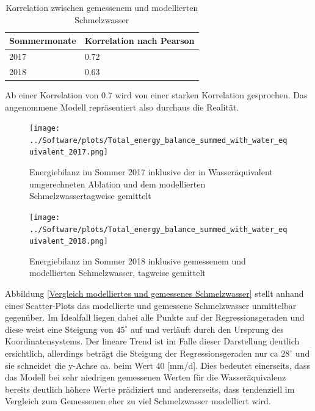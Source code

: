 \documentclass[12pt,a4paper]{article}
\begin{document}
\begin{table}[H]
\centering
{} 
\caption{Korrelation zwischen gemessenem und modellierten Schmelzwasser}
\label{tab:Korrelation zwischen gemessenem und modellierten Schmelzwasser}
\begin{tabular}{|l|l|}
\hline
Sommermonate & Korrelation nach Pearson \\ \hline
2017         & 0.72                     \\ \hline
2018         & 0.63                     \\ \hline
\end{tabular}
\end{table}

Ab einer Korrelation von 0.7 wird von einer starken Korrelation gesprochen. Das angenommene Modell repräsentiert also durchaus die Realität.

\begin{figure}[H]
\centering
\texttt{[image: ../Software/plots/Total\_energy\_balance\_summed\_with\_water\_equivalent\_2017.png]}
\caption{Energiebilanz im Sommer 2017 inklusive der in Wasseräquivalent umgerechneten Ablation und dem modellierten Schmelzwassertagweise gemittelt}
\label{fig:Energiebilanz im Sommer 2017 inklusive der in Wasseräquivalent umgerechneten Ablation und dem modellierten Schmelzwasser}
\end{figure}

\begin{figure}[H]
\centering
\texttt{[image: ../Software/plots/Total\_energy\_balance\_summed\_with\_water\_equivalent\_2018.png]}
\caption{Energiebilanz im Sommer 2018 inklusive gemessenem und modellierten Schmelzwasser, tagweise gemittelt}
\label{Energiebilanz im Sommer 2018 inklusive der in Wasseräquivalent umgerechneten Ablation und dem modellierten Schmelzwasser}
\end{figure}


Abbildung \ref{Vergleich modelliertes und gemessenes Schmelzwasser} stellt  anhand eines Scatter-Plots das modellierte und gemessene Schmelzwasser unmittelbar gegenüber. Im Idealfall liegen dabei alle Punkte auf der Regressionsgeraden und diese weist eine Steigung von $45^\circ$ auf und verläuft durch den Ursprung des Koordinatensystems. Der lineare Trend ist im Falle dieser Darstellung deutlich ersichtlich, allerdings beträgt die Steigung der Regressionsgeraden nur ca $28^\circ$ und sie schneidet die y-Achse ca. beim Wert 40 [mm/d]. Dies bedeutet einerseits, dass das Modell bei sehr niedrigen gemessenen Werten für die Wasseräquivalenz bereits deutlich höhere Werte prädiziert und andererseits, dass tendenziell im Vergleich zum Gemessenen eher zu viel Schmelzwasser modelliert wird.
\end{document}
